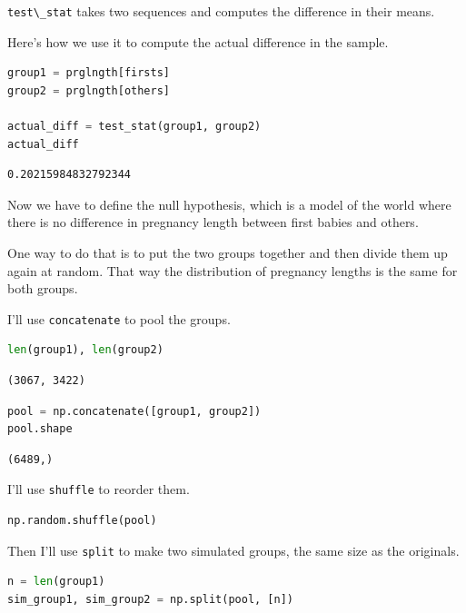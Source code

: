 \passthrough{\lstinline!test\_stat!} takes two sequences and computes
the difference in their means.

Here's how we use it to compute the actual difference in the sample.

\begin{lstlisting}[language=Python,style=source]
group1 = prglngth[firsts]
group2 = prglngth[others]

actual_diff = test_stat(group1, group2)
actual_diff
\end{lstlisting}

\begin{lstlisting}[style=output]
0.20215984832792344
\end{lstlisting}

Now we have to define the null hypothesis, which is a model of the world
where there is no difference in pregnancy length between first babies
and others.

One way to do that is to put the two groups together and then divide
them up again at random. That way the distribution of pregnancy lengths
is the same for both groups.

I'll use \passthrough{\lstinline!concatenate!} to pool the groups.

\begin{lstlisting}[language=Python,style=source]
len(group1), len(group2)
\end{lstlisting}

\begin{lstlisting}[style=output]
(3067, 3422)
\end{lstlisting}

\begin{lstlisting}[language=Python,style=source]
pool = np.concatenate([group1, group2])
pool.shape
\end{lstlisting}

\begin{lstlisting}[style=output]
(6489,)
\end{lstlisting}

I'll use \passthrough{\lstinline!shuffle!} to reorder them.

\begin{lstlisting}[language=Python,style=source]
np.random.shuffle(pool)
\end{lstlisting}

Then I'll use \passthrough{\lstinline!split!} to make two simulated
groups, the same size as the originals.

\begin{lstlisting}[language=Python,style=source]
n = len(group1)
sim_group1, sim_group2 = np.split(pool, [n])
\end{lstlisting}

